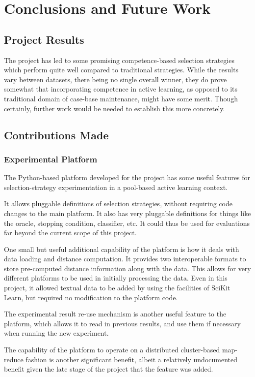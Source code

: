 \documentclass[a4paper,11pt]{report}
\begin{document}
\chapter{Conclusions and Future Work\label{cha:conclusions}}

\section{Project Results}
The project has led to some promising competence-based selection strategies which perform quite well compared to traditional strategies. While the results vary between datasets, there being no single overall winner, they do prove somewhat that incorporating competence in active learning, as opposed to its traditional domain of case-base maintenance, might have some merit. Though certainly, further work would be needed to establish this more concretely.

\section{Contributions Made}
\subsection{Experimental Platform}
The Python-based platform developed for the project has some useful features for selection-strategy experimentation in a pool-based active learning context.

It allows pluggable definitions of selection strategies, without requiring code changes to the main platform. It also has very pluggable definitions for things like the oracle, stopping condition, classifier, etc. It could thus be used for evaluations far beyond the current scope of this project.

One small but useful additional capability of the platform is how it deals with data loading and distance computation. It provides two interoperable formats to store pre-computed distance information along with the data. This allows for very different platforms to be used in initially processing the data. Even in this project, it allowed textual data to be added by using the facilities of SciKit Learn, but required no modification to the platform code.

The experimental result re-use mechanism is another useful feature to the platform, which allows it to read in previous results, and use them if necessary when running the new experiment. 

The capability of the platform to operate on a distributed cluster-based map-reduce fashion is another significant benefit, albeit a relatively undocumented benefit given the late stage of the project that the feature was added. 
\end{document}
